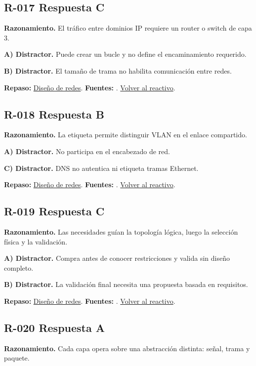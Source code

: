 \subsection*{R-017 \quad Respuesta C}\label{s:R-017}
\textbf{Razonamiento.} El tráfico entre dominios IP requiere un router o switch de capa 3.

\textbf{A) Distractor. }Puede crear un bucle y no define el encaminamiento requerido.

\textbf{B) Distractor. }El tamaño de trama no habilita comunicación entre redes.

\textbf{Repaso:} \hyperref[sec:r1]{Diseño de redes}. \textbf{Fuentes:} \cite{rfc8200,rfc4632,networks,vlan}. \hyperref[q:R-017]{Volver al reactivo}.\par\medskip

\subsection*{R-018 \quad Respuesta B}\label{s:R-018}
\textbf{Razonamiento.} La etiqueta permite distinguir VLAN en el enlace compartido.

\textbf{A) Distractor. }No participa en el encabezado de red.

\textbf{C) Distractor. }DNS no autentica ni etiqueta tramas Ethernet.

\textbf{Repaso:} \hyperref[sec:r1]{Diseño de redes}. \textbf{Fuentes:} \cite{rfc8200,rfc4632,networks,vlan}. \hyperref[q:R-018]{Volver al reactivo}.\par\medskip

\subsection*{R-019 \quad Respuesta C}\label{s:R-019}
\textbf{Razonamiento.} Las necesidades guían la topología lógica, luego la selección física y la validación.

\textbf{A) Distractor. }Compra antes de conocer restricciones y valida sin diseño completo.

\textbf{B) Distractor. }La validación final necesita una propuesta basada en requisitos.

\textbf{Repaso:} \hyperref[sec:r1]{Diseño de redes}. \textbf{Fuentes:} \cite{rfc8200,rfc4632,networks,vlan}. \hyperref[q:R-019]{Volver al reactivo}.\par\medskip

\subsection*{R-020 \quad Respuesta A}\label{s:R-020}
\textbf{Razonamiento.} Cada capa opera sobre una abstracción distinta: señal, trama y paquete.

